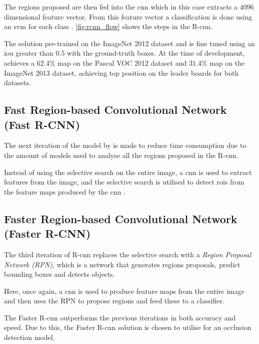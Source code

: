 The regions proposed are then fed into the \gls{cnn} which in this case extracts a $4096$ dimensional feature vector. From this feature vector a classification is done using an \gls{svm} for each class \citep{Girshick2014}. \autoref{fig:rcnn_flow} shows the steps in the R-\gls{cnn}.


The solution pre-trained on the ImageNet 2012 dataset and is fine tuned using an \gls{iou} greater than $0.5$ with the ground-truth boxes. At the time of development, \cite{Girshick2014} achieves a $62.4\%$ \gls{map} on the Pascal VOC 2012 dataset and $31.4\%$ \gls{map} on the ImageNet 2013 dataset, achieving top position on the leader boards for both datasets.

\subsection{Fast Region-based Convolutional Network (Fast R-CNN)}
The next iteration of the model by \cite{Girshick2015} is made to reduce time consumption due to the amount of models used to analyse all the regions proposed in the R-\gls{cnn}.

Instead of using the selective search on the entire image, a \gls{cnn} is used to extract features from the image, and the selective search is utilised to detect \gls{roi}s from the feature maps produced by the \gls{cnn} \citep{Girshick2015}.

\subsection{Faster Region-based Convolutional Network (Faster R-CNN)}
The third iteration of R-\gls{cnn} replaces the selective search with a \textit{Region Proposal Network (RPN)}, which is a network that generates regions proposals, predict bounding boxes and detects objects.

Here, once again, a \gls{cnn} is used to produce feature maps from the entire image and then uses the RPN to propose regions and feed these to a classifier.

The Faster R-\gls{cnn} outperforms the previous iterations in both accuracy and speed. Due to this, the Faster R-\gls{cnn} solution is chosen to utilise for an occlusion detection model.

